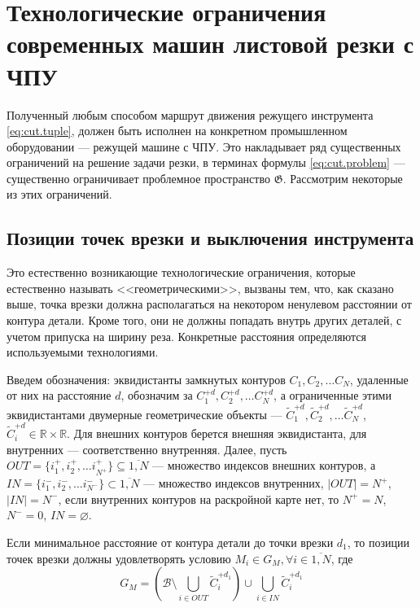 
\section{%
Технологические ограничения современных машин листовой резки с ЧПУ
}
\label{sec:cut.constr}

Полученный любым способом маршрут движения режущего инструмента~
\eqref{eq:cut.tuple},
должен быть исполнен на конкретном промышленном оборудовании ---
режущей машине с ЧПУ.
Это накладывает ряд существенных ограничений на решение задачи резки,
в терминах формулы \eqref{eq:cut.problem} ---
существенно ограничивает проблемное пространство
$\mathfrak G$.
Рассмотрим некоторые из этих ограничений.

\subsection{%
Позиции точек врезки и выключения инструмента
}
\label{sec:cut.area}

Это естественно возникающие технологические ограничения,
которые естественно называть <<геометрическими>>,
вызваны тем,
что, как сказано выше,
точка врезки должна располагаться на некотором
ненулевом расстоянии от контура детали.
Кроме того, они не должны попадать внутрь других деталей,
с учетом припуска на ширину реза.
Конкретные расстояния определяются используемыми технологиями.

Введем обозначения:
эквидистанты замкнутых контуров
$C_1, C_2, \dots C_N$,
удаленные от них на расстояние $d$,
обозначим за
$C_1^{+d}, C_2^{+d}, \dots C_N^{+d}$,
а ограниченные этими эквидистантами
двумерные геометрические объекты ---
$\widetilde C_1^{+d}, \widetilde C_2^{+d}, \dots \widetilde C_N^{+d}$,
$\widetilde C_i^{+d} \in \mathbb R \times \mathbb R$.
Для внешних контуров берется внешняя эквидистанта,
для внутренних --- соответственно внутренняя.
Далее, пусть
$OUT = \{i_1^+, i_2^+, \dots i_{N^+}^+\} \subseteq \overline{1, N}$ ---
множество индексов внешних контуров,
а
$IN = \{i_1^-, i_2^-, \dots i_{N^-}^-\} \subset \overline{1, N}$ ---
множество индексов внутренних,
$|OUT|=N^+$,
$|IN|=N^-$,
если внутренних контуров на раскройной карте нет,
то $N^+=N$, $N^-=0$, $IN=\varnothing$.

Если минимальное расстояние от контура детали до точки врезки
$d_1$,
то позиции точек врезки должны удовлетворять условию
$M_i \in G_M, \forall i \in \overline{1, N}$,
где
\begin{equation}
  \label{eq:cut.pierce}
  G_M = \left(\mathcal B \setminus \bigcup_{i \in OUT} \widetilde C_i^{+d_1} \right)
  \cup \bigcup_{i \in IN} \widetilde C_i^{+d_1}
\end{equation}

